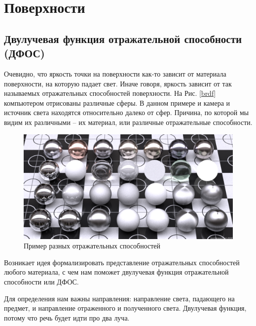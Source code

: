 \section{Поверхности}

\subsection{Двулучевая функция отражательной способности (ДФОС)}

Очевидно, что яркость точки на поверхности как-то зависит от материала поверхности,
на которую падает свет. Иначе говоря, яркость зависит от так называемых отражательных
способностей поверхности. На Рис. \eqref{brdf} компьютером отрисованы различные сферы.
В данном примере и камера и источник света находятся относительно далеко от сфер.
Причина, по которой мы видим их различными -- их материал, или различные отражательные способности.

\begin{figure}[h]
  \centering
  \includegraphics[scale=0.3]{tex/brdf.png}
  \caption{Пример разных отражательных способностей}
  \label{brdf}
\end{figure}

Возникает идея формализировать представление отражательных способностей любого материала,
с чем нам поможет двулучевая функция отражательной способности или ДФОС.

Для определения нам важны направления: направление света, падающего на предмет, и направление
отраженного и полученного света. Двулучевая функция, потому что речь будет идти про два луча.

